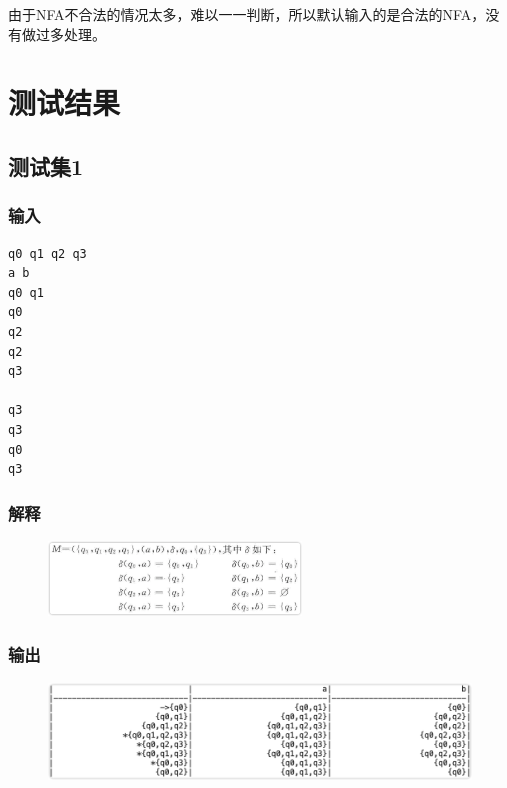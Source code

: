 \documentclass[lang=cn,11pt,a4paper,cite=authornum]{paper}
\begin{document}
由于NFA不合法的情况太多，难以一一判断，所以默认输入的是合法的NFA，没有做过多处理。

\section{测试结果}

\subsection{测试集1}

\subsubsection{输入}

\begin{listing}[H]
\begin{verbatim}
q0 q1 q2 q3
a b
q0 q1
q0
q2
q2
q3

q3
q3
q0
q3
\end{verbatim}
\end{listing}

\subsubsection{解释}

\begin{figure}[htbp]

    \centering\includegraphics[width=0.6\textwidth]{./Images/img3.png}

\end{figure}

\subsubsection{输出}

\begin{figure}[htbp]

    \centering\includegraphics[width=\textwidth]{./Images/img4.png}

\end{figure}
\end{document}
